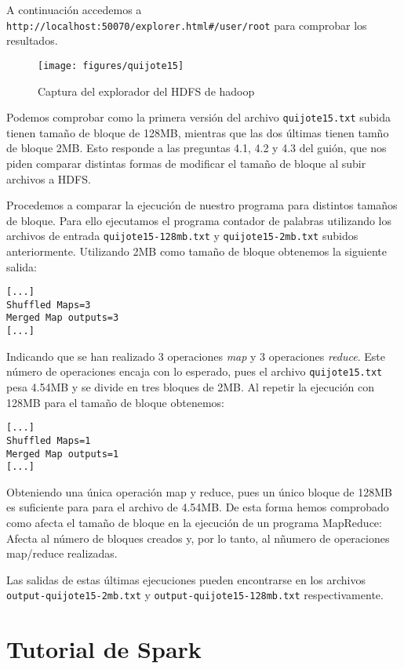 \documentclass[11pt]{article}
\def\inline{\lstinline[basicstyle=\ttfamily,keywordstyle={}]}
\begin{document}
A continuación accedemos a \inline{http://localhost:50070/explorer.html#/user/root} para comprobar los resultados.

\begin{figure}[H]
  \centering
  \texttt{[image: figures/quijote15]}
  \caption{Captura del explorador del HDFS de hadoop}
\end{figure}

Podemos comprobar como la primera versión del archivo \inline{quijote15.txt} subida tienen tamaño de bloque de 128MB, mientras que las dos últimas tienen tamño de bloque 2MB. Esto responde a las preguntas 4.1, 4.2 y 4.3 del guión, que nos piden comparar distintas formas de modificar el tamaño de bloque al subir archivos a HDFS.

Procedemos a comparar la ejecución de nuestro programa para distintos tamaños de bloque. Para ello ejecutamos el programa contador de palabras utilizando los archivos de entrada \inline{quijote15-128mb.txt} y \inline{quijote15-2mb.txt} subidos anteriormente. Utilizando 2MB como tamaño de bloque obtenemos la siguiente salida:

\begin{verbatim}
[...]
Shuffled Maps=3
Merged Map outputs=3
[...]
\end{verbatim}

Indicando que se han realizado 3 operaciones \emph{map} y 3 operaciones \emph{reduce}. Este número de operaciones encaja con lo esperado, pues el archivo \inline{quijote15.txt} pesa 4.54MB y se divide en tres bloques de 2MB. Al repetir la ejecución con 128MB para el tamaño de bloque obtenemos:

\begin{verbatim}
[...]
Shuffled Maps=1
Merged Map outputs=1
[...]
\end{verbatim}

Obteniendo una única operación map y reduce, pues un único bloque de 128MB es suficiente para para el archivo de 4.54MB. De esta forma hemos comprobado como afecta el tamaño de bloque en la ejecución de un programa MapReduce: Afecta al número de bloques creados y, por lo tanto, al nñumero de operaciones map/reduce realizadas.

Las salidas de estas últimas ejecuciones pueden encontrarse en los archivos \inline{output-quijote15-2mb.txt} y \inline{output-quijote15-128mb.txt} respectivamente.


\newpage
\section{ Tutorial de Spark}
\end{document}
